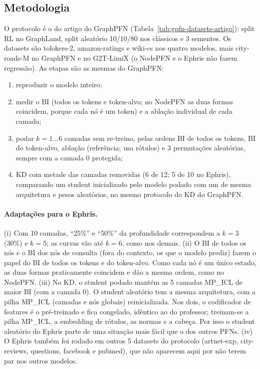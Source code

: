 \documentclass[12pt,a4paper]{article}
\begin{document}
\subsection{Metodologia}

O protocolo é o do artigo do GraphPFN (Tabela~\ref{tab:gpfn-datasets-artigo}): split RL no GraphLand, split aleatório 10/10/80 nos clássicos e 3 sementes. Os datasets são tolokers-2, amazon-ratings e wiki-cs nos quatro modelos, mais city-roads-M no GraphPFN e no G2T-LimiX (o NodePFN e o Ephris não fazem regressão). As etapas são as mesmas do GraphPFN:
\begin{enumerate}
  \item reproduzir o modelo inteiro;
  \item medir o BI (todos os tokens e token-alvo; no NodePFN as duas formas coincidem, porque cada nó é um token) e a ablação individual de cada camada;
  \item podar $k=1\ldots6$ camadas sem re-treino, pelas ordens BI de todos os tokens, BI do token-alvo, ablação (referência; usa rótulos) e 3 permutações aleatórias, sempre com a camada 0 protegida;
  \item KD com metade das camadas removidas (6 de 12; 5 de 10 no Ephris), comparando um student inicializado pelo modelo podado com um de mesma arquitetura e pesos aleatórios, no mesmo protocolo do KD do GraphPFN.
\end{enumerate}
\paragraph{Adaptações para o Ephris.} (i) Com 10 camadas, ``25\%'' e ``50\%'' da profundidade correspondem a $k=3$ (30\%) e $k=5$; as curvas vão até $k=6$, como nos demais. (ii) O BI de todos os nós e o BI dos nós de consulta (fora do contexto, os que o modelo prediz) fazem o papel do BI de todos os tokens e do token-alvo. Como cada nó é um único estado, as duas formas praticamente coincidem e dão a mesma ordem, como no NodePFN. (iii) No KD, o student podado mantém as 5 camadas MP\_ICL de maior BI (com a camada 0). O student aleatório tem a mesma arquitetura, com a pilha MP\_ICL (camadas e nós globais) reinicializada. Nos dois, o codificador de features é o pré-treinado e fica congelado, idêntico ao do professor; treinam-se a pilha MP\_ICL, a embedding de rótulos, as normas e a cabeça. Por isso o student aleatório do Ephris parte de uma situação mais fácil que o dos outros PFNs. (iv) O Ephris também foi rodado em outros 5 datasets do protocolo (artnet-exp, city-reviews, questions, facebook e pubmed), que não aparecem aqui por não terem par nos outros modelos.
\end{document}
